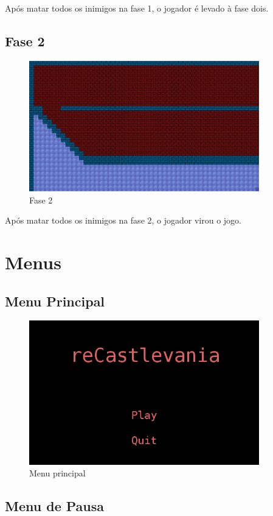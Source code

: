 \documentclass[12pt]{article}
\begin{document}
Após matar todos os inimigos na fase 1, o jogador é levado à fase dois.

\subsection{Fase 2}

\begin{figure}[H]
\centering
\includegraphics[width=100mm]{map2.png}
\caption{Fase 2}
\label{m2}
\end{figure}

Após matar todos os inimigos na fase 2, o jogador virou o jogo.

\section{Menus}

\subsection{Menu Principal}

\begin{figure}[H]
\centering
\includegraphics[width=100mm]{mainMenu.png}
\caption{Menu principal}
\label{mm}
\end{figure}

\subsection{Menu de Pausa}
\end{document}
